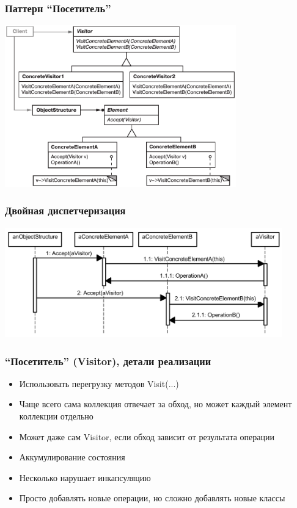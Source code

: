 \documentclass{../../slides-style}
\begin{document}
    \begin{frame}
        \frametitle{Паттерн ``Посетитель''}
        \begin{center}
            \includegraphics[width=0.75\textwidth]{visitor.png}
        \end{center}
    \end{frame}

    \begin{frame}
        \frametitle{Двойная диспетчеризация}
        \begin{center}
            \includegraphics[width=0.9\textwidth]{doubleDispatching.png}
        \end{center}
    \end{frame}

    \begin{frame}
        \frametitle{``Посетитель'' (Visitor), детали реализации}
        \begin{itemize}
            \item Использовать перегрузку методов Visit(...)
            \item Чаще всего сама коллекция отвечает за обход, но может каждый элемент коллекции отдельно
            \item Может даже сам Visitor, если обход зависит от результата операции
            \item Аккумулирование состояния
            \item Несколько нарушает инкапсуляцию
            \item Просто добавлять новые операции, но сложно добавлять новые классы
        \end{itemize}
    \end{frame}
\end{document}
